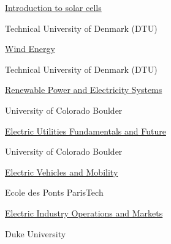 \documentclass[]{Keval-resume}
\begin{document}
{{\begin{minipage}[t]{.6\textwidth}
	\textbullet{} \href{https://www.coursera.org/account/accomplishments/certificate/39QNCRDL2H9B}{Introduction to solar cells}
\end{minipage}%
\begin{minipage}[t]{.4\textwidth}
	\hfill Technical University of Denmark (DTU)
\end{minipage}
\begin{minipage}[t]{.6\textwidth}
	\textbullet{} \href{https://www.coursera.org/account/accomplishments/certificate/66YHRZR5ZVZD}{{Wind Energy}}
\end{minipage}%
\begin{minipage}[t]{.4\textwidth}
	\hfill Technical University of Denmark (DTU)
\end{minipage}
\begin{minipage}[t]{.65\textwidth}
	\textbullet{} \href{https://www.coursera.org/verify/3G7SAU233PH9}{{Renewable Power and Electricity Systems}}
\end{minipage}%
\begin{minipage}[t]{.35\textwidth}
	\hfill University of Colorado Boulder
\end{minipage}
\begin{minipage}[t]{.65\textwidth}
	\textbullet{} \href{https://www.coursera.org/account/accomplishments/certificate/CAQW5DEPDA4Q}{{Electric Utilities Fundamentals and Future}}
\end{minipage}%
\begin{minipage}[t]{.35\textwidth}
	\hfill University of Colorado Boulder
\end{minipage}
\begin{minipage}[t]{.65\textwidth}
	\textbullet{} \href{https://www.coursera.org/account/accomplishments/certificate/4YT4G3V23XKV}{{Electric Vehicles and Mobility}}
\end{minipage}%
\begin{minipage}[t]{.35\textwidth}
	\hfill Ecole des Ponts ParisTech
\end{minipage}
\begin{minipage}[t]{.7\textwidth}
	\textbullet{} \href{https://www.coursera.org/account/accomplishments/certificate/MAV4KRYGYAUU}{{Electric Industry Operations and Markets}}
\end{minipage}%
\begin{minipage}[t]{.3\textwidth}
	\hfill Duke University
\end{minipage}
\begin{minipage}[t]{.6\textwidth}

\end{minipage}}}
\end{document}
